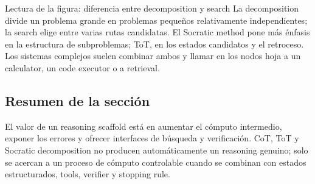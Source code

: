\begin{knowledgebox}{Lectura de la figura: diferencia entre decomposition y search}
La decomposition divide un problema grande en problemas pequeños relativamente independientes; la search elige entre varias rutas candidatas. El Socratic method pone más énfasis en la estructura de subproblemas; ToT, en los estados candidatos y el retroceso. Los sistemas complejos suelen combinar ambos y llamar en los nodos hoja a un calculator, un code executor o a retrieval.
\end{knowledgebox}

\subsection{Resumen de la sección}

El valor de un reasoning scaffold está en aumentar el cómputo intermedio, exponer los errores y ofrecer interfaces de búsqueda y verificación. CoT, ToT y Socratic decomposition no producen automáticamente un reasoning genuino; solo se acercan a un proceso de cómputo controlable cuando se combinan con estados estructurados, tools, verifier y stopping rule.
